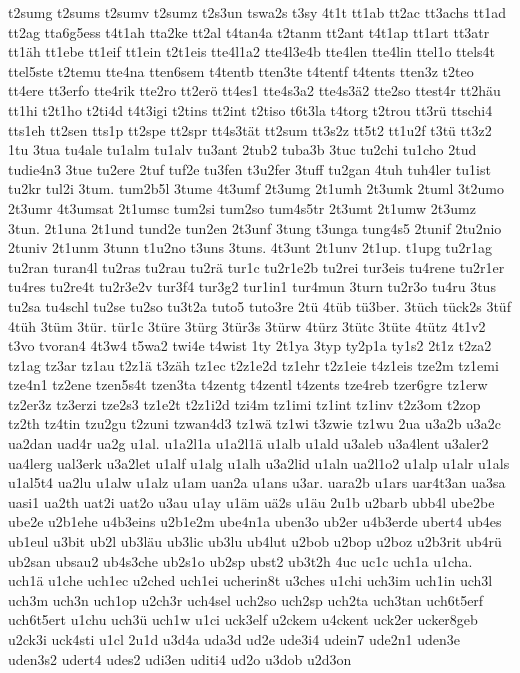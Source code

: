 {t2sumg
t2sums
t2sumv
t2sumz
t2s3un
tswa2s
t3sy
4t1t
tt1ab
tt2ac
tt3achs
tt1ad
tt2ag
tta6g5ess
t4t1ah
tta2ke
tt2al
t4tan4a
t2tanm
tt2ant
t4t1ap
tt1art
tt3atr
tt1äh
tt1ebe
tt1eif
tt1ein
t2t1eis
tte4l1a2
tte4l3e4b
tte4len
tte4lin
ttel1o
ttels4t
ttel5ste
t2temu
tte4na
tten6sem
t4tentb
tten3te
t4tentf
t4tents
tten3z
t2teo
tt4ere
tt3erfo
tte4rik
tte2ro
tt2erö
tt4es1
tte4s3a2
tte4s3ä2
tte2so
ttest4r
tt2häu
tt1hi
t2t1ho
t2ti4d
t4t3igi
t2tins
tt2int
t2tiso
t6t3la
t4torg
t2trou
tt3rü
ttschi4
tts1eh
tt2sen
tts1p
tt2spe
tt2spr
tt4s3tät
tt2sum
tt3s2z
tt5t2
tt1u2f
t3tü
tt3z2
1tu
3tua
tu4ale
tu1alm
tu1alv
tu3ant
2tub2
tuba3b
3tuc
tu2chi
tu1cho
2tud
tudie4n3
3tue
tu2ere
2tuf
tuf2e
tu3fen
t3u2fer
3tuff
tu2gan
4tuh
tuh4ler
tu1ist
tu2kr
tul2i
3tum.
tum2b5l
3tume
4t3umf
2t3umg
2t1umh
2t3umk
2tuml
3t2umo
2t3umr
4t3umsat
2t1umsc
tum2si
tum2so
tum4s5tr
2t3umt
2t1umw
2t3umz
3tun.
2t1una
2t1und
tund2e
tun2en
2t3unf
3tung
t3unga
tung4s5
2tunif
2tu2nio
2tuniv
2t1unm
3tunn
t1u2no
t3uns
3tuns.
4t3unt
2t1unv
2t1up.
t1upg
tu2r1ag
tu2ran
turan4l
tu2ras
tu2rau
tu2rä
tur1c
tu2r1e2b
tu2rei
tur3eis
tu4rene
tu2r1er
tu4res
tu2re4t
tu2r3e2v
tur3f4
tur3g2
tur1in1
tur4mun
3turn
tu2r3o
tu4ru
3tus
tu2sa
tu4schl
tu2se
tu2so
tu3t2a
tuto5
tuto3re
2tü
4tüb
tü3ber.
3tüch
tück2s
3tüf
4tüh
3tüm
3tür.
tür1c
3türe
3türg
3tür3s
3türw
4türz
3tütc
3tüte
4tütz
4t1v2
t3vo
tvoran4
4t3w4
t5wa2
twi4e
t4wist
1ty
2t1ya
3typ
ty2p1a
ty1s2
2t1z
t2za2
tz1ag
tz3ar
tz1au
t2z1ä
t3zäh
tz1ec
t2z1e2d
tz1ehr
t2z1eie
t4z1eis
tze2m
tz1emi
tze4n1
tz2ene
tzen5s4t
tzen3ta
t4zentg
t4zentl
t4zents
tze4reb
tzer6gre
tz1erw
tz2er3z
tz3erzi
tze2s3
tz1e2t
t2z1i2d
tzi4m
tz1imi
tz1int
tz1inv
t2z3om
t2zop
tz2th
tz4tin
tzu2gu
t2zuni
tzwan4d3
tz1wä
tz1wi
t3zwie
tz1wu
2ua
u3a2b
u3a2c
ua2dan
uad4r
ua2g
u1al.
u1a2l1a
u1a2l1ä
u1alb
u1ald
u3aleb
u3a4lent
u3aler2
ua4lerg
ual3erk
u3a2let
u1alf
u1alg
u1alh
u3a2lid
u1aln
ua2l1o2
u1alp
u1alr
u1als
u1al5t4
ua2lu
u1alw
u1alz
u1am
uan2a
u1ans
u3ar.
uara2b
u1ars
uar4t3an
ua3sa
uasi1
ua2th
uat2i
uat2o
u3au
u1ay
u1äm
uä2s
u1äu
2u1b
u2barb
ubb4l
ube2be
ube2e
u2b1ehe
u4b3eins
u2b1e2m
ube4n1a
uben3o
ub2er
u4b3erde
ubert4
ub4es
ub1eul
u3bit
ub2l
ub3läu
ub3lic
ub3lu
ub4lut
u2bob
u2bop
u2boz
u2b3rit
ub4rü
ub2san
ubsau2
ub4s3che
ub2s1o
ub2sp
ubst2
ub3t2h
4uc
uc1c
uch1a
u1cha.
uch1ä
u1che
uch1ec
u2ched
uch1ei
ucherin8t
u3ches
u1chi
uch3im
uch1in
uch3l
uch3m
uch3n
uch1op
u2ch3r
uch4sel
uch2so
uch2sp
uch2ta
uch3tan
uch6t5erf
uch6t5ert
u1chu
uch3ü
uch1w
u1ci
uck3elf
u2ckem
u4ckent
uck2er
ucker8geb
u2ck3i
uck4sti
u1cl
2u1d
u3d4a
uda3d
ud2e
ude3i4
udein7
ude2n1
uden3e
uden3s2
udert4
udes2
udi3en
uditi4
ud2o
u3dob
u2d3on
}

